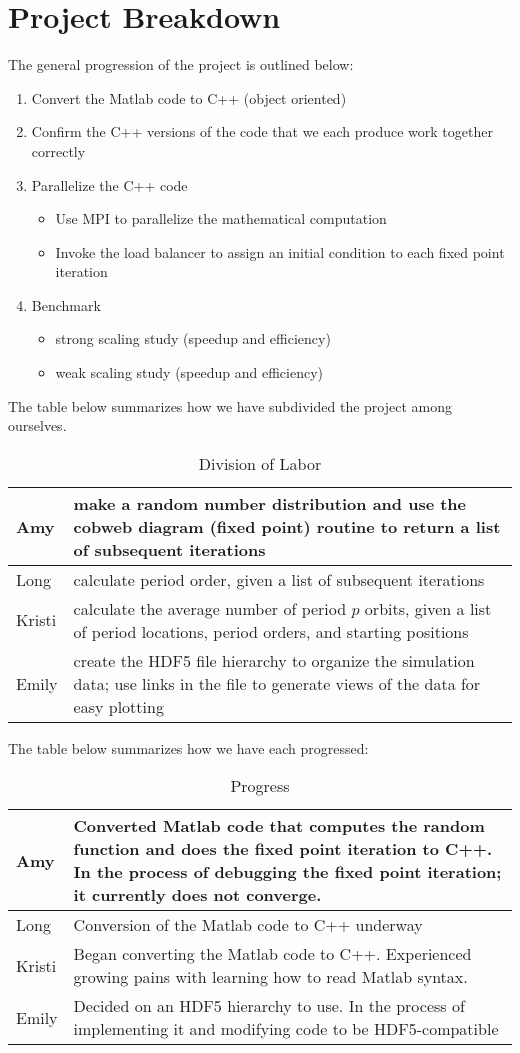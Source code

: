 \documentclass[12pt]{article}
\newcommand{\be}{\begin{enumerate}}
\newcommand{\ee}{\end{enumerate}}
\newcommand{\bi}{\begin{itemize}}
\newcommand{\ei}{\end{itemize}}
\begin{document}
\section{Project Breakdown}
The general progression of the project is outlined below:
\be
\item Convert the Matlab code to C++ (object oriented)
\item Confirm the C++ versions of the code that we each produce work
  together correctly
\item Parallelize the C++ code
\bi
\item Use MPI to parallelize the mathematical computation
\item Invoke the load balancer to assign an initial condition to each
  fixed point iteration \cite{dlb}
\ei
\item Benchmark 
\bi
\item strong scaling study (speedup and efficiency)
\item weak scaling study (speedup and efficiency)
\ei
\ee
\noindent The table below summarizes how we have subdivided the project among
ourselves. 
\begin {table}[H]
\centering
\caption{Division of Labor}
    \begin{tabular}{ |p{1cm}|p{10cm}|} 
    \hline
    Amy &  make a random number distribution and use the cobweb
    diagram (fixed point) routine to return a list of subsequent iterations\\ \hline
    Long & calculate period order, given a list of subsequent iterations  \\ \hline
    Kristi & calculate the average number of period $p$ orbits, given
    a list of period locations, period orders, and starting positions\\ \hline
    Emily  & create the HDF5 file hierarchy to organize the simulation
    data; use links in the file to generate views of the data for easy
    plotting\\ \hline
    \end{tabular}
\end{table}
\newpage
\noindent The table below summarizes how we have each progressed:
\begin {table}[H]
\centering
\caption{Progress}
    \begin{tabular}{ |p{1cm}|p{10cm}|} 
    \hline
    Amy &  Converted Matlab code that computes the random function and
    does the fixed point iteration to C++. In the process of debugging
    the fixed point iteration; it currently does not converge. \\ \hline
    Long & Conversion of the Matlab code to C++ underway\\ \hline
    Kristi & Began converting the Matlab code to C++. Experienced
    growing pains with learning how to read Matlab syntax.\\ \hline
    Emily  & Decided on an HDF5 hierarchy to use. In the process of
    implementing it and modifying code to be HDF5-compatible\\ \hline
    \end{tabular}
\end{table}
\end{document}
